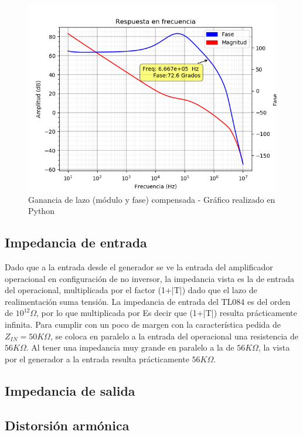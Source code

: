 \begin{figure}[!ht]
\begin{centering}
\includegraphics[scale=0.45]{Imagenes/LazoCompenzar.png}
\par\end{centering}
\caption{Ganancia de lazo (módulo y fase) compensada - Gráfico realizado en Python}
\end{figure}

\subsection{Impedancia de entrada}

Dado que a la entrada desde el generador se ve la entrada del amplificador operacional en configuración de no inversor, la impedancia vista es la de entrada del operacional, multiplicada por el factor (1+|T|) dado que el lazo de realimentación suma tensión. La impedancia de entrada del TL084 es del orden de $10^{12}\Omega$, por lo que multiplicada por Es decir que (1+|T|) resulta prácticamente infinita. Para cumplir con un poco de margen con la característica pedida de $Z_{IN} = 50K\Omega$, se coloca en paralelo a la entrada del operacional una resistencia de $56K\Omega$. Al tener una impedancia muy grande en paralelo a la de $56K\Omega$, la vista por el generador a la entrada resulta prácticamente $56K\Omega$.

\subsection{Impedancia de salida}


\subsection{Distorsión armónica}


